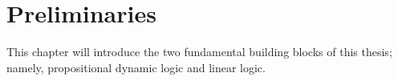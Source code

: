 \chapter{Preliminaries}
This chapter will introduce the two fundamental building blocks of this thesis; namely, propositional dynamic logic and linear logic.

